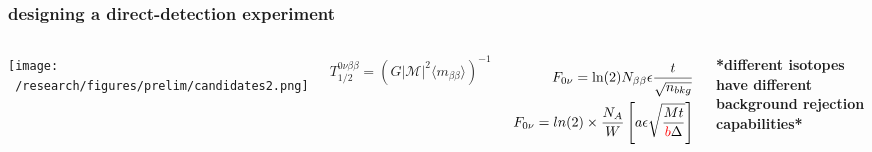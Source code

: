 \documentclass{beamer}
\begin{document}
	\begin{frame}
		\frametitle{designing a direct-detection experiment}
		\begin{columns}[c] %
			
			\hspace*{-0.5cm}\texttt{[image: ~/research/figures/prelim/candidates2.png]}
			
			\begin{equation*}
			T_{1/2}^{0\nu\beta\beta} = \left( G|\mathcal{M}|^2 \langle m_{\beta\beta}\rangle \right) ^{-1}
			\end{equation*}
			
%			
			\begin{eqnarray*}
			F_{0\nu} =  \text{ln}(2)N_{\beta\beta}\epsilon \frac{t}{\sqrt{n_{bkg}}} \\
			F_{0\nu} = ln(2) \times \frac{N_A}{W} \left[ a\epsilon \sqrt{\frac{Mt}{\textcolor{red}{b}\Delta}}\right]
			\end{eqnarray*}
			
			{\tiny \textbf{*different isotopes have different background rejection capabilities*}}
		\end{columns}
	\end{frame}
	
\end{document}
